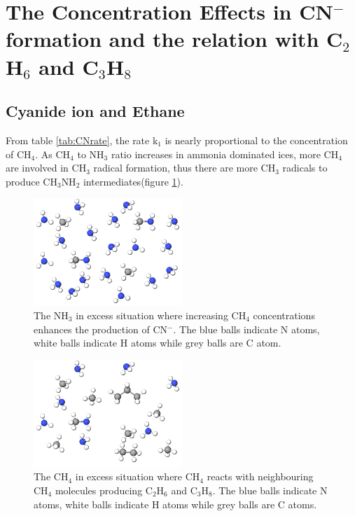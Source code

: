 \section{The Concentration Effects in CN$^-$formation and the relation with C$_2$H$_6$ and C$_3$H$_8$}



\subsection{Cyanide ion and Ethane}

From table \ref{tab:CNrate}, the rate k$_1$ is nearly proportional to the concentration of CH$_4$.  As CH$_4$ to NH$_3$ ratio increases in ammonia dominated ices, more CH$_4$ are involved in CH$_3$ radical formation, thus there are more CH$_3$ radicals to produce CH$_3$NH$_2$ intermediates(figure \ref{fig:NH3_dominated}).\\

\begin{figure}
\centering
\includegraphics[width=0.5\textwidth]{figures/ammonia_dominating.png}
\caption{The NH$_3$ in excess situation where increasing CH$_4$ concentrations enhances the production of CN$^-$. The blue balls indicate N atoms, white balls indicate H atoms while grey balls are C atom.}
\label{fig:NH3_dominated}
\end{figure}


\begin{figure}
\centering
\includegraphics[width=0.5\textwidth]{figures/methane_dominating.png}
\caption{The CH$_4$ in excess situation where CH$_4$ reacts with neighbouring CH$_4$ molecules producing C$_2$H$_6$ and C$_3$H$_8$. The blue balls indicate N atoms, white balls indicate H atoms while grey balls are C atoms.}
\label{fig:CH4_dominated}
\end{figure}

